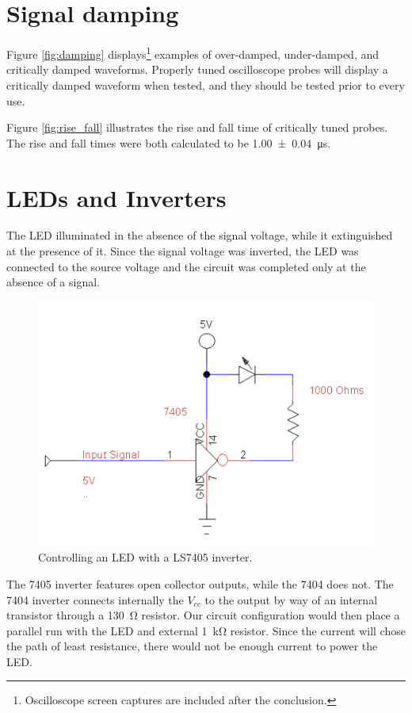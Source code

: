 \documentclass[11pt]{article}
\begin{document}
\section{Signal damping}

Figure \ref{fig:damping} displays\footnote{Oscilloscope screen captures are included after the conclusion.} examples of over-damped, under-damped, and critically damped waveforms. Properly tuned oscilloscope probes will display a critically damped waveform when tested, and they should be tested prior to every use.

Figure \ref{fig:rise_fall} illustrates the rise and fall time of critically tuned probes.  The rise and fall times were both calculated to be \SI{1.00 +- 0.04}{\micro\second}.

\section{LEDs and Inverters}

The LED illuminated in the absence of the signal voltage, while it extinguished at the presence of it. Since the signal voltage was inverted, the LED was connected to the source voltage and the circuit was completed only at the absence of a signal.

\begin{figure}[h]
	\centering
	\includegraphics[scale=0.6, draft=false]{inverter}
	\caption{Controlling an LED with a LS7405 inverter.}
	\label{fig:inverter}
\end{figure}

The 7405 inverter features open collector outputs, while the 7404 does not. The 7404 inverter connects internally the $V_{cc}$ to the output by way of an internal transistor through a \SI{130}{\ohm} resistor. Our circuit configuration would then place a parallel run with the LED and external \SI{1}{\kilo\ohm} resistor. Since the current will chose the path of least resistance, there would not be enough current to power the LED. 
\end{document}
